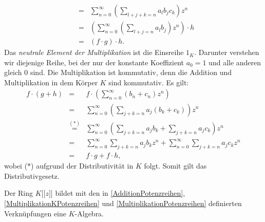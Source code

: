 {\begin{eqnarray*}
&=& \sum_{n=0}^\infty \left(\sum_{l+j+k=n} a_l b_jc_k\right) z^n \\
&=& \left(\sum_{n=0}^\infty \left(\sum_{l+j=n} a_l b_j\right) z^n\right) \cdot h \\
&=& \left(f \cdot g\right) \cdot h.
\end{eqnarray*} 
Das \textit{neutrale Element der Multiplikation} ist die Einsreihe $1_K$. Darunter verstehen wir diejenige Reihe, bei der nur der konstante Koeffizient $a_0 = 1$ und alle anderen gleich $0$ sind.
Die Multiplikation ist kommutativ, denn die Addition und Multiplikation in dem Körper $K$ sind kommutativ. 
Es gilt:
\begin{eqnarray*}
f\cdot \left(g + h\right) &=& f \cdot \left( \sum_{n=0}^\infty \left(b_n + c_n\right) z^n \right)\\
&=& \sum_{n=0}^\infty \left(\sum_{j+k=n} a_j \left(b_k +c_k\right)\right) z^n\\
&\stackrel{\mathrm{(*)}}=& \sum_{n=0}^\infty \left(\sum_{j+k=n} a_j b_k +\sum_{j+k=n} a_j c_k\right) z^n\\
&=& \sum_{n=0}^\infty \sum_{j+k=n} a_j b_k z^n +\sum_{n=0}^\infty \sum_{j+k=n} a_j c_k z^n\\
&=& f\cdot g + f\cdot h,
\end{eqnarray*}
wobei ($*$) aufgrund der Distributivität in $K$ folgt. Somit gilt das Distributivgesetz.\\
 }
%
%
%
%
\begin{bem}
Der Ring $K\lbrack\lbrack z\rbrack\rbrack$ bildet mit den in \ref{AdditionPotenzreihen}, \ref{MultiplikationKPotenzreihen} und \ref{MultiplikationPotenzreihen} definierten Verknüpfungen eine $K$-Algebra.
\end{bem}
%
%
